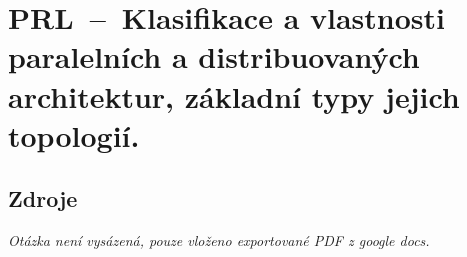 

\graphicspath{{prl/klasifikace_paralelnich_architektur/figures}}


\chapter{PRL~--~Klasifikace a vlastnosti paralelních a distribuovaných architektur, základní typy jejich topologií.}


\section{Zdroje}

\begin{compactitem}
    \item {}
    \item \textit{Otázka není vysázená, pouze vloženo exportované PDF z google docs.}
\end{compactitem}




